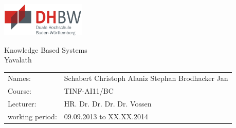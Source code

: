 \documentclass[english]{report}
\begin{document}
\pagestyle{fancy}

\rfoot{\thepage}
\fancyhfoffset{\marginparsep}
\renewcommand{\footrulewidth}{1.0pt}
\renewcommand{\headrulewidth}{1.0pt}
\renewcommand{\headheight}{30pt}





\begin{titlepage}

\begin{flushright}
    \includegraphics*[width=4.0cm]{abbildungen/dhbwlogo} \\ 
\end{flushright}
\begin{center}
\vspace{1.5cm}
\Huge{ \textsf{Knowledge Based Systems}} \\
	Yavalath\\
    \vspace{4cm}
 \normalsize{
    \begin{tabular}{ll}
    	Names: & {Schabert Christoph  Alaniz Stephan  Brodhacker Jan} \\
    	Course: & {TINF-AI11/BC}	\\
    	Lecturer: &  HR. Dr. Dr. Dr. Dr. Vossen\\
    	working period: & 09.09.2013 to XX.XX.2014
    \end{tabular}\\
    }
\end{center}

\end{titlepage}

\newpage
\end{document}
